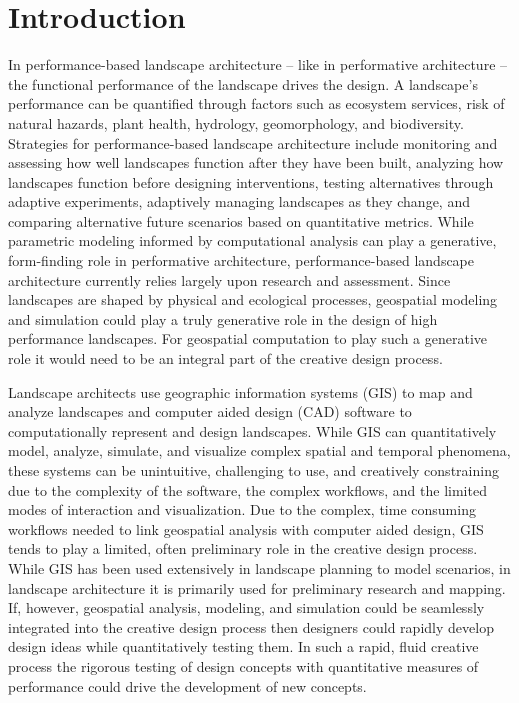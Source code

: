 \documentclass[Afour,sagev,times]{sagej} %
\begin{document}
\maketitle


\section{Introduction}

In performance-based landscape architecture 
-- like in performative architecture \cite{Kolarevic2005} --
the functional performance of the landscape drives the design.
A landscape's performance 
can be quantified through factors such as
ecosystem services, risk of natural hazards, plant health, 
hydrology, geomorphology, and biodiversity. 
Strategies for performance-based landscape architecture include
monitoring and assessing how well landscapes function
after they have been built, \cite{Yang2016}
analyzing how landscapes function before designing interventions,
testing alternatives through adaptive experiments,
adaptively managing landscapes as they change, 
and comparing alternative future scenarios 
based on quantitative metrics. \cite{Lovell2015}
While parametric modeling informed by computational analysis 
can play a generative, form-finding role 
in performative architecture, 
performance-based landscape architecture 
currently relies largely upon research and assessment.
Since landscapes are shaped by physical and ecological processes,
geospatial modeling and simulation could play a truly generative role 
in the design of high performance landscapes.
%
For geospatial computation to 
play such a generative role
it would need to be an integral part 
of the creative design process.

Landscape architects use 
geographic information systems (GIS) to map and analyze landscapes
and computer aided design (CAD) software
to computationally represent and design landscapes.
While GIS can quantitatively model, analyze, simulate, and visualize 
complex spatial and temporal phenomena,
these systems can be unintuitive, 
challenging to use, and creatively constraining
due to the complexity of the software, 
the complex workflows, 
and the limited modes of interaction and visualization. 
\cite{Ratti2004}
Due to the complex, time consuming workflows 
needed to link geospatial analysis with computer aided design, 
GIS tends to play a limited, 
often preliminary role in the creative design process.
While GIS has been used extensively in landscape planning 
to model scenarios, \cite{Steinitz2004,Baker2004,Steinitz2012}
in landscape architecture
it is primarily used for preliminary research and mapping.
If, however, geospatial analysis, modeling, and simulation
could be seamlessly integrated into the creative design process 
then designers could rapidly develop design ideas
while quantitatively testing them. 
In such a rapid, fluid creative process
the rigorous testing of design concepts 
with quantitative measures of performance 
could drive the development of new concepts.
\end{document}
